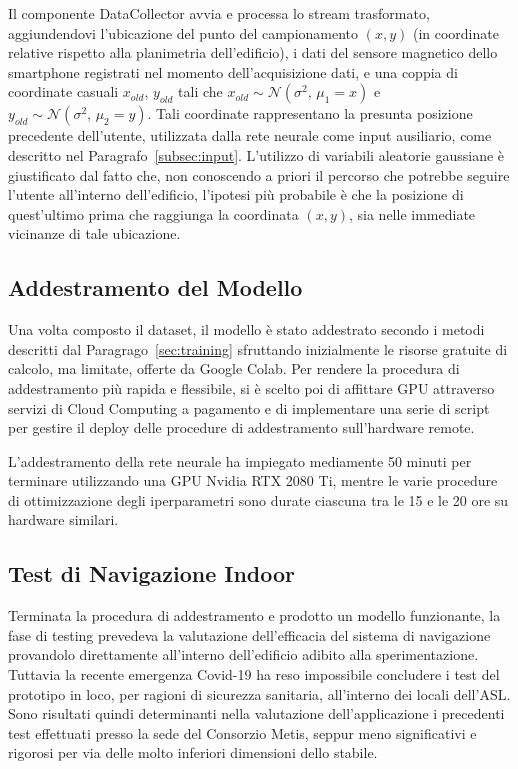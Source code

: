 Il componente DataCollector avvia e processa lo stream trasformato,
aggiundendovi l'ubicazione del punto del campionamento \((x, y)\) (in coordinate
relative rispetto alla planimetria dell'edificio), i dati del sensore magnetico
dello smartphone registrati nel momento dell'acquisizione dati, e una coppia di
coordinate casuali \(x_{old}, \, y_{old}\) tali che 
\( x_{old} \sim \mathcal{N}(\sigma^2, \, \mu_1 = x) \) e 
\( y_{old} \sim \mathcal{N}(\sigma^2, \, \mu_2 = y) \). Tali coordinate
rappresentano la presunta posizione precedente dell'utente, utilizzata dalla
rete neurale come input ausiliario, come descritto nel
Paragrafo~\ref{subsec:input}. L'utilizzo di variabili aleatorie gaussiane è
giustificato dal fatto che, non conoscendo a priori il percorso che potrebbe
seguire l'utente all'interno dell'edificio, l'ipotesi più probabile è che la
posizione di quest'ultimo prima che raggiunga la coordinata \((x, y)\), sia
nelle immediate vicinanze di tale ubicazione.

\subsection{Addestramento del Modello}
Una volta composto il dataset, il modello è stato addestrato secondo i metodi
descritti dal Paragrago~\ref{sec:training} sfruttando inizialmente le risorse
gratuite di calcolo, ma limitate, offerte da Google Colab. Per rendere la
procedura di addestramento più rapida e flessibile, si è scelto poi di
affittare GPU attraverso servizi di Cloud Computing a pagamento e di
implementare una serie di script per gestire il deploy delle procedure di
addestramento sull'hardware remote.

L'addestramento della rete neurale ha impiegato mediamente 50 minuti per
terminare utilizzando una GPU Nvidia RTX 2080 Ti, mentre le varie procedure di
ottimizzazione degli iperparametri sono durate ciascuna tra le 15 e le 20 ore
su hardware similari.
\subsection{Test di Navigazione Indoor}
Terminata la procedura di addestramento e prodotto un modello funzionante, la
fase di testing prevedeva la valutazione dell'efficacia del sistema di
navigazione provandolo direttamente all'interno dell'edificio adibito alla
sperimentazione. Tuttavia la recente emergenza Covid-19 ha reso impossibile
concludere i test del prototipo in loco, per ragioni di sicurezza sanitaria,
all'interno dei locali dell'ASL\@. Sono risultati quindi determinanti nella
valutazione dell'applicazione i precedenti test effettuati presso la sede del
Consorzio Metis, seppur meno significativi e rigorosi per via delle molto
inferiori dimensioni dello stabile.


